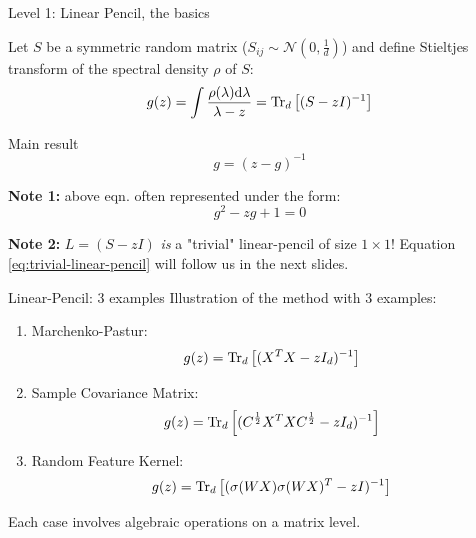 \documentclass[10pt]{beamer}
\begin{document}
\begin{frame}{Level 1: Linear Pencil, the basics}

  Let $S$ be a symmetric random matrix ($S_{ij} \sim \mathcal N(0, \frac{1}{d})$) and define Stieltjes transform of the spectral density $\rho$ of $S$:
  $$ g(z) = \int \frac{\rho(\lambda) \dd \lambda}{\lambda - z} = \traceLim[d]{ (S - zI)^{-1}}$$

  \begin{block}{Main result \cite{wigner1958distribution}}
    \begin{equation}\label{eq:trivial-linear-pencil}
        g = (z-g)^{-1}
    \end{equation}
  \end{block}

  \textbf{Note 1:} above eqn. often represented under the form:
  $$g^2 - zg + 1 = 0$$

  \textbf{Note 2:} 
  $L=(S-zI)$ \emph{is} a "trivial" linear-pencil of size $1 \times 1$! 
  Equation \eqref{eq:trivial-linear-pencil} will follow us in the next slides.

\end{frame}


\begin{frame}{Linear-Pencil: 3 examples}
  Illustration of the method with 3 examples:
  \begin{enumerate}
    \item Marchenko-Pastur:
    $$ g(z) = \traceLim[d]{(X^TX-zI_d)^{-1}}$$
    \item Sample Covariance Matrix:
    $$ g(z) = \traceLim[d]{(C^\frac12 X^TX C^\frac12 -zI_d)^{-1}}$$
    \item Random Feature Kernel:
    $$ g(z) = \traceLim[d]{(\sigma(W X) \sigma(W X)^T-zI)^{-1}}$$
  \end{enumerate}

  \begin{block}{}
    Each case involves algebraic operations on a matrix level.
  \end{block}
\end{frame}
\end{document}
